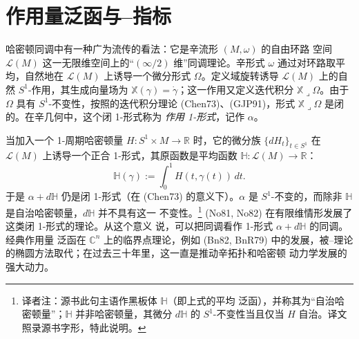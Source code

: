 \chapter{作用量泛函与\personConley{}--\personZehnder{}指标}
\label{ch:action-conley-zehnder}

哈密顿\personFloer{}同调中有一种广为流传的看法：它是辛流形 $(M,\omega)$ 的自由环路
空间 $\mathcal L(M)$ 这一无限维空间上的“$(\infty/2)$ 维”同调理论。辛形式
$\omega$ 通过对环路取平均，自然地在 $\mathcal L(M)$ 上诱导一个微分形式
$\Omega$。定义域旋转诱导 $\mathcal L(M)$ 上的自然 $S^1$-作用，其生成向量场为
$\mathbb X(\gamma)=\dot\gamma$；这一作用又定义迭代积分
$\mathbb X\mathbin{\lrcorner}\Omega$。由于 $\Omega$ 具有 $S^1$-不变性，按照\personChen{}的迭代积分理论 (Chen73)、(GJP91)，形式
$\mathbb X\mathbin{\lrcorner}\Omega$ 是闭的。在辛几何中，这个闭 1-形式称为
\emph{作用 1-形式}，记作 $\alpha$。

当加入一个 1-周期哈密顿量 $H:S^1\times M\to\mathbb R$ 时，它的微分族
$\{dH_t\}_{t\in S^1}$ 在 $\mathcal L(M)$ 上诱导一个正合 1-形式，其原函数是平均函数
$\mathbb H:\mathcal L(M)\to\mathbb R$：
\[
  \mathbb H(\gamma):=\int_0^1 H(t,\gamma(t))\,dt.
\]
于是 $\alpha+d\mathbb H$ 仍是闭 1-形式（在 (Chen73) 的意义下）。$\alpha$ 是
$S^1$-不变的，而除非 $\mathbb H$ 是自治哈密顿量，$d\mathbb H$ 并不具有这一
不变性。\footnote{译者注：源书此句主语作黑板体 $\mathbb H$（即上式的平均
泛函），并称其为“自治哈密顿量”；$\mathbb H$ 并非哈密顿量，其微分
$d\mathbb H$ 的 $S^1$-不变性当且仅当 $H$ 自治。译文照录源书字形，特此说明。}
\personNovikov{} (No81, No82) 在有限维情形发展了这类闭 1-形式的\personMorse{}理论。从这个意义
说，可以把\personFloer{}同调看作 1-形式 $\alpha+d\mathbb H$ 的\personNovikov{}同调。经典作用量
泛函在 $\mathbb C^n$ 上的临界点理论，例如 (Bn82, BnR79) 中的发展，被\personNovikov{}--\personFloer{}理论的椭圆方法取代；在过去三十年里，这一直是推动辛拓扑和哈密顿
动力学发展的强大动力。






